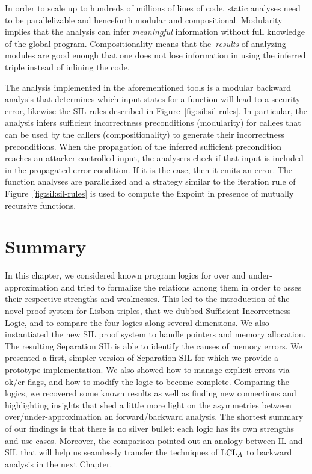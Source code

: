 In order to scale up to hundreds of millions of lines of code, static analyses need to be parallelizable and henceforth modular and compositional. Modularity implies that the analysis can infer \emph{meaningful} information without full knowledge of the global program. Compositionality means that the~\emph{results} of analyzing modules are good enough that one does not lose information in using the inferred triple instead of inlining the code.

The analysis implemented in the aforementioned tools is a modular backward analysis that determines which input states for a function will lead to a security error, likewise the SIL rules described in Figure~\ref{fig:sil:sil-rules}.
In particular, the analysis infers sufficient incorrectness preconditions (modularity) for callees that can be used by the callers (compositionality) to generate their incorrectness preconditions.
When the propagation of the inferred sufficient precondition reaches an attacker\hyp{}controlled input, the analysers check if that input is included in the propagated error condition.
If it is the case, then it emits an error.
The function analyses are parallelized and a strategy similar to the iteration rule of Figure~\ref{fig:sil:sil-rules} is used to compute the fixpoint in presence of mutually recursive functions.

\section{Summary}
In this chapter, we considered known program logics for over and under-approximation and tried to formalize the relations among them in order to asses their respective strengths and weaknesses. This led to the introduction of the novel proof system for Lisbon triples, that we dubbed Sufficient Incorrectness Logic, and to compare the four logics along several dimensions.
We also instantiated the new SIL proof system to handle pointers and memory allocation. The resulting Separation SIL is able to identify the causes of memory errors. We presented a first, simpler version of Separation SIL for which we provide a prototype implementation. We also showed how to manage explicit errors via ok/er flags, and how to modify the logic to become complete.
Comparing the logics, we recovered some known results as well as finding new connections and highlighting insights that shed a little more light on the asymmetries between over/under-approximation an forward/backward analysis. The shortest summary of our findings is that there is no silver bullet: each logic has its own strengths and use cases. Moreover, the comparison pointed out an analogy between IL and SIL that will help us seamlessly transfer the techniques of $\text{LCL}_A$ to backward analysis in the next Chapter.
